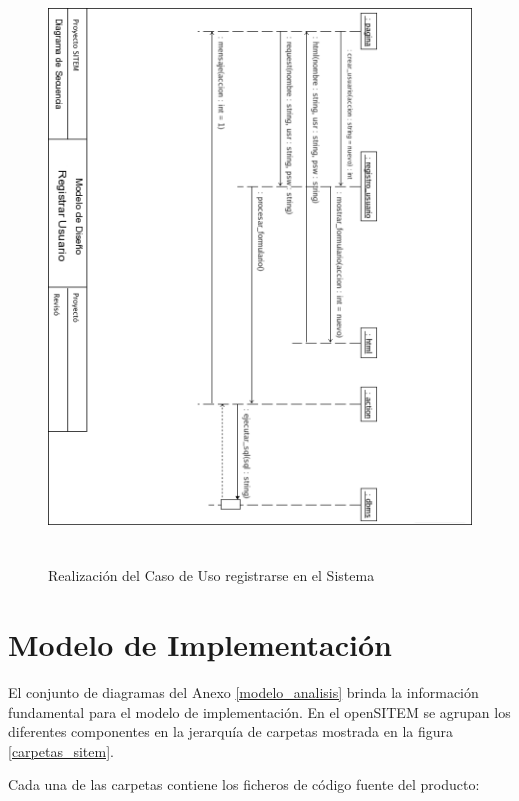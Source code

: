 \begin{figure}
 \centering
 \includegraphics[width=156mm, height=156mm]{secuencia.png}
 \caption{Realización del Caso de Uso registrarse en el Sistema}
 \label{secuencia}
\end{figure}


\section{Modelo de Implementación}

El conjunto de diagramas del Anexo \ref{modelo_analisis} brinda la información fundamental para el modelo de implementación. En el openSITEM se agrupan los diferentes componentes en la jerarquía de carpetas mostrada en la figura \ref{carpetas_sitem}.

Cada una de las carpetas contiene los ficheros de código fuente del producto:

